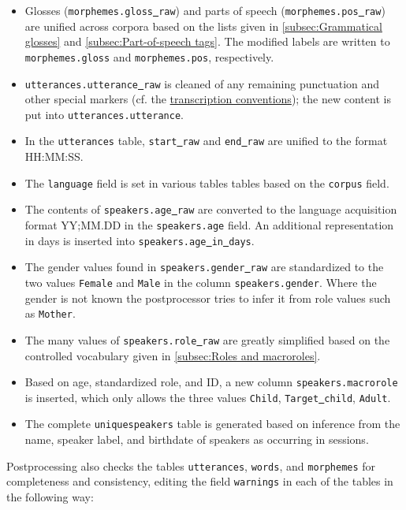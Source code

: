 \documentclass[a4paper, 11pt]{book}
\newcommand{\und}{\underline{{ }}\hspace{0.2mm}}	%
\begin{document}
\begin{itemize}
	\item Glosses (\texttt{morphemes.gloss\und raw}) and parts of speech (\texttt{morphemes.pos\und raw}) are unified across corpora based on the lists given in \autoref{subsec:Grammatical glosses} and \autoref{subsec:Part-of-speech tags}. 
		The modified labels are written to \texttt{morphemes.gloss} and \texttt{morphemes.pos}, respectively. 
	\item \texttt{utterances.utterance\und raw} is cleaned of any remaining punctuation and other special markers (cf. the \hyperref[subsec:Transcription conventions]{transcription conventions}); the new content is put into \texttt{utterances.utterance}.
	\item In the \texttt{utterances} table, \texttt{start\und raw} and \texttt{end\und raw} are unified to the format HH:MM:SS. 
	\item The \texttt{language} field is set in various tables tables based on the \texttt{corpus} field.
	\item The contents of \texttt{speakers.age\und raw} are converted to the language acquisition format YY;MM.DD in the \texttt{speakers.age} field.
		An additional representation in days is inserted into \texttt{speakers.age\und in\und days}. 	
	\item The gender values found in \texttt{speakers.gender\und raw} are standardized to the two values \texttt{Female} and \texttt{Male}
		in the column \texttt{speakers.gender}. Where the gender is not known the postprocessor tries to infer it from role values such as \texttt{Mother}. 
	\item The many values of \texttt{speakers.role\und raw} are greatly simplified based on the controlled vocabulary given in \autoref{subsec:Roles and macroroles}. 
	\item Based on age, standardized role, and ID, a new column \texttt{speakers.macrorole} is inserted, which only allows the three values
		\texttt{Child}, \texttt{Target\und child}, \texttt{Adult}. 
	\item The complete \texttt{uniquespeakers} table is generated based on inference from the name, speaker label, and birthdate of speakers as occurring in sessions. 
\end{itemize}

Postprocessing also checks the tables \texttt{utterances}, \texttt{words}, and \texttt{morphemes} for completeness and consistency, editing the field \texttt{warnings} in each of the tables in the following way: \\
\end{document}
